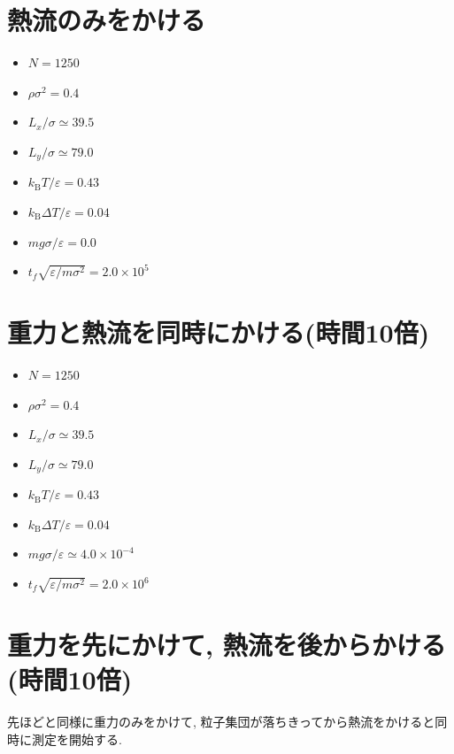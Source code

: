 

\section{熱流のみをかける}

\begin{itemize}
  \item $N = 1250$
  \item $\rho {\sigma}^2 = 0.4$
  \item $L_x / \sigma \simeq 39.5$
  \item $L_y / \sigma \simeq 79.0$
  \item $k_{\text{B}} T / \varepsilon = 0.43$
  \item $k_{\text{B}} \Delta T / \varepsilon = 0.04$
  \item $mg\sigma/\varepsilon = 0.0$
  \item $t_f \sqrt{\varepsilon / m \sigma^2} = 2.0 \times 10^{5}$
\end{itemize}



\section{重力と熱流を同時にかける(時間10倍)}

\begin{itemize}
  \item $N = 1250$
  \item $\rho {\sigma}^2 = 0.4$
  \item $L_x / \sigma \simeq 39.5$
  \item $L_y / \sigma \simeq 79.0$
  \item $k_{\text{B}} T / \varepsilon = 0.43$
  \item $k_{\text{B}} \Delta T / \varepsilon = 0.04$
  \item $mg\sigma/\varepsilon \simeq 4.0 \times 10^{-4}$
  \item $t_f \sqrt{\varepsilon / m \sigma^2} = 2.0 \times 10^{6}$
\end{itemize}



\section{重力を先にかけて, 熱流を後からかける(時間10倍)}

先ほどと同様に重力のみをかけて, 粒子集団が落ちきってから熱流をかけると同時に測定を開始する.


